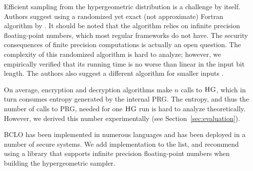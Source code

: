 		Efficient sampling from the hypergeometric distribution is a challenge by itself.
		Authors suggest using a randomized yet exact (not approximate) Fortran algorithm by \textcite{hg-sampler}.
		It should be noted that the algorithm relies on infinite precision floating-point numbers, which most regular frameworks do not have.
		The security consequences of finite precision computations is actually an open question.
		The complexity of this randomized algorithm is hard to analyze; however, we empirically verified that its running time is no worse than linear in the input bit length.
		The authors also suggest a different algorithm for smaller inputs \cite{hg-sampler-small}.

		On average, encryption and decryption algorithms make $n$ calls to $\textsc{HG}$, which in turn consumes entropy generated by the internal PRG\@.
		The entropy, and thus the number of calls to PRG, needed for one $\textsc{HG}$ run is hard to analyze theoretically.
		However, we derived this number experimentally (see Section~\ref{sec:evaluation}).

		BCLO has been implemented in numerous languages and has been deployed in a number of secure systems.
		We add {\Csharp} implementation to the list, and recommend using a library that supports infinite precision floating-point numbers when building the hypergeometric sampler.
